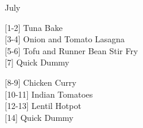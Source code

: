 		\begin{menu}{July}
    
    \begin{recipelist}
    
        {\scriptsize[1-2]} Tuna Bake\\
        {\scriptsize[3-4]} Onion and Tomato Lasagna\\
        {\scriptsize[5-6]} Tofu and Runner Bean Stir Fry\\
        {\scriptsize[7]} Quick Dummy\\%
    \end{recipelist}%
    \begin{recipelist}
    
        {\scriptsize[8-9]} Chicken Curry\\
        {\scriptsize[10-11]} Indian Tomatoes\\
        {\scriptsize[12-13]} Lentil Hotpot\\
        {\scriptsize[14]} Quick Dummy\\%
    \end{recipelist}\par%
  

\end{menu}
